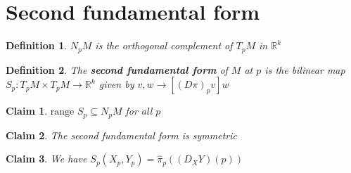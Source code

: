 \documentclass{article}
\newtheorem{definition}{Definition}
\newtheorem{claim}{Claim}
\begin{document}
\section{Second fundamental form}

\begin{definition}
    $N_pM$ is the orthogonal complement of $T_pM$ in $\mathbb{R}^k$
\end{definition}

\begin{definition}
    The \textbf{second fundamental form} of $M$ at $p$ is the bilinear map $S_p: T_pM \times T_pM \to \mathbb{R}^k$ given by $v,w \to [(D\pi)_pv]w$
\end{definition}

\begin{claim}
    $\text{range }S_p \subseteq N_pM$ for all $p$
\end{claim}

\begin{claim}
    The second fundamental form is symmetric
\end{claim}

\begin{claim}
    We have $S_p(X_p,Y_p)=\hat{\pi}_p((D_XY)(p))$
\end{claim}
\end{document}
